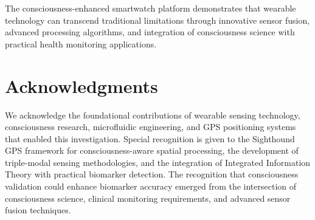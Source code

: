\documentclass[12pt,a4paper]{article}
\begin{document}
The consciousness-enhanced smartwatch platform demonstrates that wearable technology can transcend traditional limitations through innovative sensor fusion, advanced processing algorithms, and integration of consciousness science with practical health monitoring applications.

\section*{Acknowledgments}

We acknowledge the foundational contributions of wearable sensing technology, consciousness research, microfluidic engineering, and GPS positioning systems that enabled this investigation. Special recognition is given to the Sighthound GPS framework for consciousness-aware spatial processing, the development of triple-modal sensing methodologies, and the integration of Integrated Information Theory with practical biomarker detection. The recognition that consciousness validation could enhance biomarker accuracy emerged from the intersection of consciousness science, clinical monitoring requirements, and advanced sensor fusion techniques.
\end{document}
